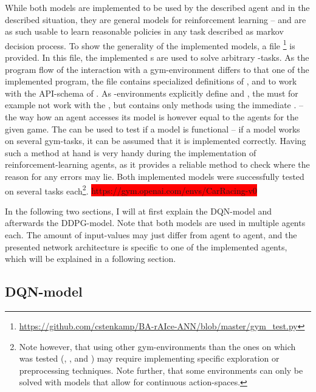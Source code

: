While both models are implemented to be used by the described agent and in the described situation, they are general models for reinforcement learning -- and are as such usable to learn reasonable policies in any task described as markov decision process. To show the generality of the implemented models, a file \footnote{\url{https://github.com/cstenkamp/BA-rAIce-ANN/blob/master/gym\_test.py}} is provided. In this file, the implemented s are used to solve arbitrary -tasks. As the program flow of the interaction with a gym-environment differs to that one of the implemented program, the file contains specialized definitions of ,  and  to work with the API-schema of . As -environments explicitly define  and , the  must for example not work with the , but contains only methods using the immediate . -- the way how an agent accesses its model is however equal to the agents for the given game. The  can be used to test if a model is functional -- if a model works on several gym-tasks, it can be assumed that it is implemented correctly. Having such a method at hand is very handy during the implementation of reinforcement-learning agents, as it provides a reliable method to check where the reason for any errors may lie. Both implemented models were successfully tested on several tasks each\footnote{Note however, that using other gym-environments than the ones on which was tested (, ,  and ) may require implementing specific exploration or preprocessing techniques. Note further, that some environments can only be solved with models that allow for continuous action-spaces.}.
\colorbox{red}{https://gym.openai.com/envs/CarRacing-v0}

In the following two sections, I will at first explain the DQN-model and afterwards the DDPG-model. Note that both models are used in multiple agents each. The amount of input-values may just differ from agent to agent, and the presented network architecture is specific to one of the implemented agents, which will be explained in a following section.


\subsection{DQN-model}

